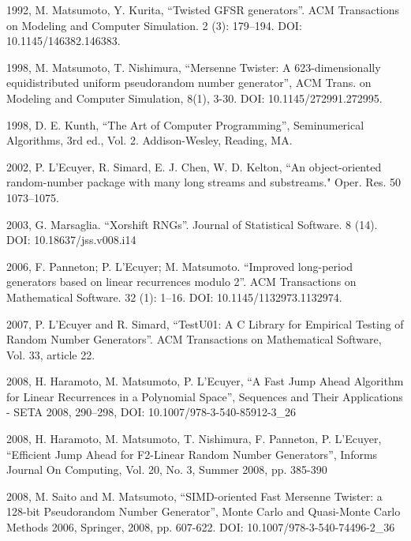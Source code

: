 \documentclass[preprint,1p,times]{elsarticle}
\begin{document}
			\begin{thebibliography}{9}
				
				 1992, M. Matsumoto, Y. Kurita, ``Twisted GFSR generators''. ACM Transactions on Modeling and Computer Simulation. 2 (3): 179--194. DOI: 10.1145/146382.146383.
				
				 1998, M. Matsumoto, T. Nishimura, ``Mersenne Twister: A 623-dimensionally equidistributed uniform pseudorandom number generator'', ACM Trans. on Modeling and Computer Simulation, 8(1), 3-30. DOI: 10.1145/272991.272995.
				
				 1998, D. E. Kunth, ``The Art of Computer Programming'', Seminumerical Algorithms, 3rd ed., Vol. 2. Addison-Wesley, Reading, MA.
				
				 2002, P. L’Ecuyer, R. Simard, E. J. Chen, W. D. Kelton, ``An object-oriented random-number package with many long streams and substreams." Oper. Res. 50 1073--1075.
				
				 2003, G. Marsaglia. ``Xorshift RNGs''. Journal of Statistical Software. 8 (14). DOI: 10.18637/jss.v008.i14
				
				 2006, F. Panneton; P. L'Ecuyer; M. Matsumoto. ``Improved long-period generators based on linear recurrences modulo 2''. ACM Transactions on Mathematical Software. 32 (1): 1--16. DOI: 10.1145/1132973.1132974.
				
				 2007, P. L'Ecuyer and R. Simard, ``TestU01: A C Library for Empirical Testing of Random Number Generators''. ACM Transactions on Mathematical Software, Vol. 33, article 22.
				
				 2008, H. Haramoto, M. Matsumoto, P. L’Ecuyer, ``A Fast Jump Ahead Algorithm for Linear Recurrences in a Polynomial Space'', Sequences and Their Applications - SETA 2008, 290--298, DOI: 10.1007/978-3-540-85912-3\_26
				
				 2008, H. Haramoto, M. Matsumoto, T. Nishimura, F. Panneton, P. L’Ecuyer, ``Efficient Jump Ahead for F2-Linear Random Number Generators'', Informs Journal On Computing, Vol. 20, No. 3, Summer 2008, pp. 385-390
				
				 2008, M. Saito and M. Matsumoto, ``SIMD-oriented Fast Mersenne Twister: a 128-bit Pseudorandom Number Generator'', Monte Carlo and Quasi-Monte Carlo Methods 2006, Springer, 2008, pp. 607-622. DOI: 10.1007/978-3-540-74496-2\_36
				

\end{thebibliography}
\end{document}
